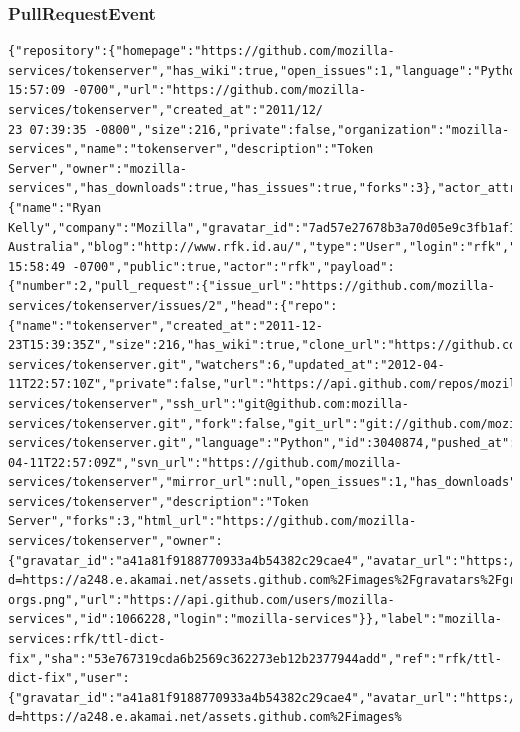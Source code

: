 \documentclass[a4paper,10pt]{article}
\begin{document}
\subsubsection{PullRequestEvent}
\begin{lstlisting}
{"repository":{"homepage":"https://github.com/mozilla-services/tokenserver","has_wiki":true,"open_issues":1,"language":"Python","watchers":6,"fork":false,"pushed_at":"2012/04/11 15:57:09 -0700","url":"https://github.com/mozilla-services/tokenserver","created_at":"2011/12/
23 07:39:35 -0800","size":216,"private":false,"organization":"mozilla-services","name":"tokenserver","description":"Token Server","owner":"mozilla-services","has_downloads":true,"has_issues":true,"forks":3},"actor_attributes":{"name":"Ryan Kelly","company":"Mozilla","gravatar_id":"7ad57e27678b3a70d05e9c3fb1af123e","location":"Melbourne, Australia","blog":"http://www.rfk.id.au/","type":"User","login":"rfk","email":"ryan@rfk.id.au"},"created_at":"2012/04/11 15:58:49 -0700","public":true,"actor":"rfk","payload":{"number":2,"pull_request":{"issue_url":"https://github.com/mozilla-services/tokenserver/issues/2","head":{"repo":{"name":"tokenserver","created_at":"2011-12-23T15:39:35Z","size":216,"has_wiki":true,"clone_url":"https://github.com/mozilla-services/tokenserver.git","watchers":6,"updated_at":"2012-04-11T22:57:10Z","private":false,"url":"https://api.github.com/repos/mozilla-services/tokenserver","ssh_url":"git@github.com:mozilla-services/tokenserver.git","fork":false,"git_url":"git://github.com/mozilla-
services/tokenserver.git","language":"Python","id":3040874,"pushed_at":"2012-04-11T22:57:09Z","svn_url":"https://github.com/mozilla-services/tokenserver","mirror_url":null,"open_issues":1,"has_downloads":true,"has_issues":true,"homepage":"https://github.com/mozilla-services/tokenserver","description":"Token Server","forks":3,"html_url":"https://github.com/mozilla-services/tokenserver","owner":{"gravatar_id":"a41a81f9188770933a4b54382c29cae4","avatar_url":"https://secure.gravatar.com/avatar/a41a81f9188770933a4b54382c29cae4?d=https://a248.e.akamai.net/assets.github.com%2Fimages%2Fgravatars%2Fgravatar-orgs.png","url":"https://api.github.com/users/mozilla-services","id":1066228,"login":"mozilla-services"}},"label":"mozilla-services:rfk/ttl-dict-fix","sha":"53e767319cda6b2569c362273eb12b2377944add","ref":"rfk/ttl-dict-fix","user":{"gravatar_id":"a41a81f9188770933a4b54382c29cae4","avatar_url":"https://secure.gravatar.com/avatar/a41a81f9188770933a4b54382c29cae4?d=https://a248.e.akamai.net/assets.github.com%2Fimages%

\end{lstlisting}
\end{document}

